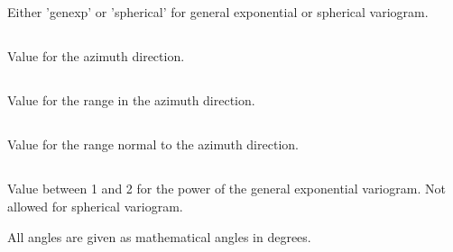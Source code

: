 \subsection{}
 \slist
   \item \Description Either 'genexp' or 'spherical' for general exponential or spherical variogram.
   \item \Argument
   \item \Default
 \elist

\subsection{}
 \slist
   \item \Description Value for the azimuth direction.
   \item \Argument
   \item \Default
 \elist

\subsection{}
 \slist
   \item \Description Value for the range in the azimuth direction.
   \item \Argument
   \item \Default
 \elist

\subsection{}
 \slist
   \item \Description Value for the range normal to the azimuth direction.
   \item \Argument
   \item \Default
 \elist

\subsection{}
 \slist
   \item \Description Value between 1 and 2 for the power of the general exponential variogram. Not allowed for spherical variogram.
   \item \Argument
   \item \Default
 \elist

All angles are given as mathematical angles in degrees.
